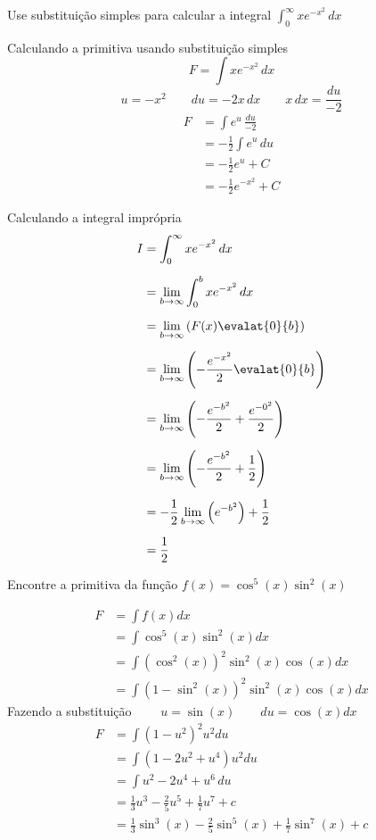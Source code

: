 \documentclass[a4paper,12pt,fleqn]{article}
\begin{document}
Use substituição simples para calcular a integral
\(
  \int_0^\infty x e^{-x^2}\,dx
\)

\begin{answer}
  Calculando a primitiva usando substituição simples
  \[
    F = \int x e^{-x^2}\,dx
  \]
  \[
    u = -x^2
    \qquad
    du = -2x\,dx
    \qquad
    x\,dx = \frac{du}{-2}
  \]
  \begin{align*}
    F & = \int e^{u}\,\frac{du}{-2} \\[2mm]
      & = -\frac{1}{2}\int e^{u}\,du \\[2mm]
      & = -\frac{1}{2} e^{u} + C \\[2mm]
      & = -\frac{1}{2} e^{-x^2} + C
  \end{align*}

  Calculando a integral imprópria
  \begin{align*}
    I & = \int_0^\infty x e^{-x^2}\,dx \\[2mm]
      & = \lim_{b\to\infty}\int_0^b x e^{-x^2}\,dx \\[2mm]
      & = \lim_{b\to\infty}\left(F(x)\evalat{0}{b}\right) \\[2mm]
      & = \lim_{b\to\infty}\left(-\frac{e^{-x^2}}{2} \evalat{0}{b}\right) \\[2mm]
      & = \lim_{b\to\infty}\left(-\frac{e^{-b^2}}{2} + \frac{e^{-0^2}}{2}  \right) \\[2mm]
      & = \lim_{b\to\infty}\left(-\frac{e^{-b^2}}{2} + \frac{1}{2} \right) \\[2mm]
      & = -\frac{1}{2}\lim_{b\to\infty}\left(e^{-b^2} \right) + \frac{1}{2} \\[2mm]
      & = \frac{1}{2}
  \end{align*}
\end{answer}

Encontre a primitiva da função \(f(x) = \cos^5(x)\sin^2(x) \)

\begin{answer}
  \begin{align*}
    F
    & = \int f(x) dx \\
    & = \int \cos^5(x)\sin^2(x) dx \\
    & = \int \left(\cos^2(x)\right)^2\sin^2(x)\cos(x) dx \\
    & = \int \left(1-\sin^2(x)\right)^2\sin^2(x)\cos(x) dx
  \end{align*}
  Fazendo a substituição
  \(
  \qquad
  u = \sin(x)
  \qquad
  du = \cos(x)dx
  \)
  \begin{align*}
    F
    & = \int \left(1-u^2\right)^2 u^2 du \\
    & = \int \left(1-2u^2+u^4\right) u^2 du \\
    & = \int u^2-2u^4+u^6 \, du \\
    & = \frac{1}{3} u^3
      - \frac{2}{5} u^5
      + \frac{1}{7} u^7
      + c \\
    & = \frac{1}{3} \sin^3(x)
      - \frac{2}{5} \sin^5(x)
      + \frac{1}{7} \sin^7(x)
      + c
  \end{align*}
\end{answer}
\end{document}
